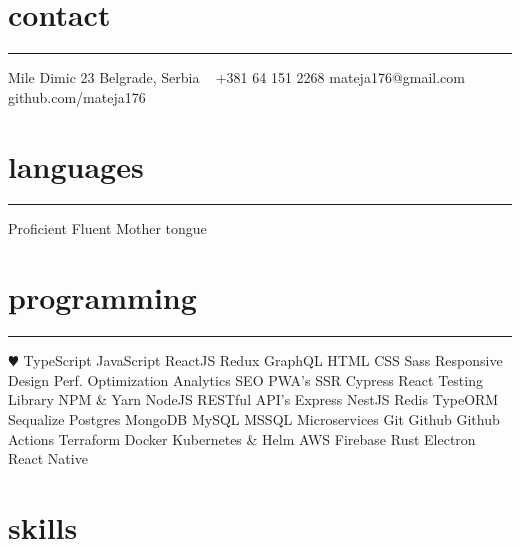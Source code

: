 \documentclass[]{cv-style}          %
\begin{document}


\begin{aside}
  \section{contact}
  \color{gray} \rule{\textwidth}{0.1mm}
  Mile Dimic 23
  Belgrade, Serbia
  ~
  +381 64 151 2268
  mateja176@gmail.com
    {\subtitlefont github.com/mateja176}
  \section{languages}
  \rule{\textwidth}{0.1mm}
  \space\space\space\space\space\space\space\space\space\space\space\space Proficient
  \space\space\space\space\space\space\space\space\space\space\space\space\space\space\space\space\space\space Fluent
  \space\space Mother tongue
  \section{programming}
  \rule{\textwidth}{0.1mm}
  {\color{blue} $\varheartsuit$} TypeScript
  JavaScript
  ReactJS
  Redux
  GraphQL
  HTML
  CSS
  Sass
  Responsive Design
  Perf. Optimization
  Analytics
  SEO
  PWA's
  SSR
  Cypress
  React Testing Library
  NPM \& Yarn
  NodeJS
  RESTful API's
  Express
  NestJS
  Redis
  TypeORM
  Sequalize
  Postgres
  MongoDB
  MySQL
  MSSQL
  Microservices
  Git
  Github
  Github Actions
  Terraform
  Docker
  Kubernetes \& Helm
  AWS
  Firebase
  Rust
  Electron
  React Native
\end{aside}


\section{skills}
\vspace{-0.2cm}
\end{document}
